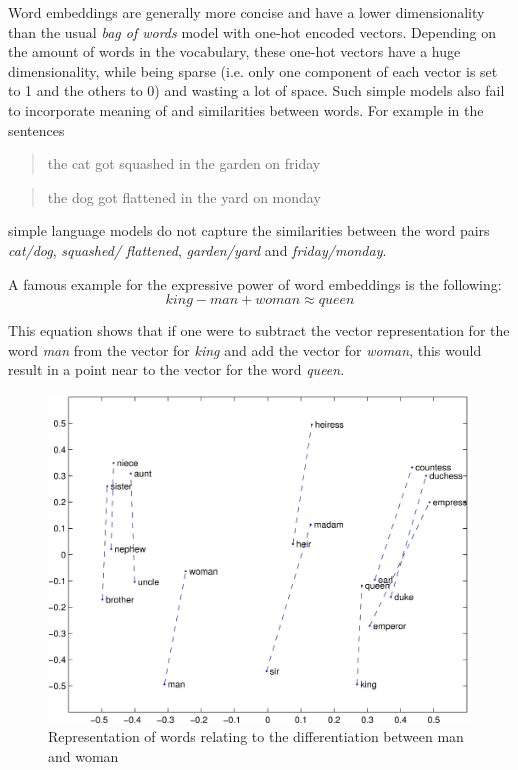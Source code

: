 \documentclass[10pt,a4paper]{article}
\begin{document}
		Word embeddings are generally more concise and have a lower dimensionality than the usual \textit{bag of words} model with one-hot encoded vectors. Depending on the amount of words in the vocabulary, these one-hot vectors have a huge dimensionality, while being sparse (i.e. only one component of each vector is set to 1 and the others to 0) and wasting a lot of space. Such simple models also fail to incorporate meaning of and similarities between words. For example in the sentences
		\begin{quote}
			the cat got squashed in the garden on friday
		\end{quote}
		\begin{quote}
			the dog got flattened in the yard on monday
		\end{quote}
		simple language models do not capture the similarities between the word pairs \textit{cat/dog}, \textit{squashed/ flattened}, \textit{garden/yard} and \textit{friday/monday}.
		
		A famous example for the expressive power of word embeddings is the following:
		\begin{displaymath}
			king-man+woman \approx queen
		\end{displaymath}
		
		This equation shows that if one were to subtract the vector representation for the word \textit{man} from the vector for \textit{king} and add the vector for \textit{woman}, this would result in a point near to the vector for the word \textit{queen}.
		
		\begin{figure}[h]
			\centering
			\includegraphics[width=0.8\linewidth]{data/man_woman}
			\caption{Representation of words relating to the differentiation between man and woman}
			\label{fig:wordembeddings}
		\end{figure}
		
\end{document}
